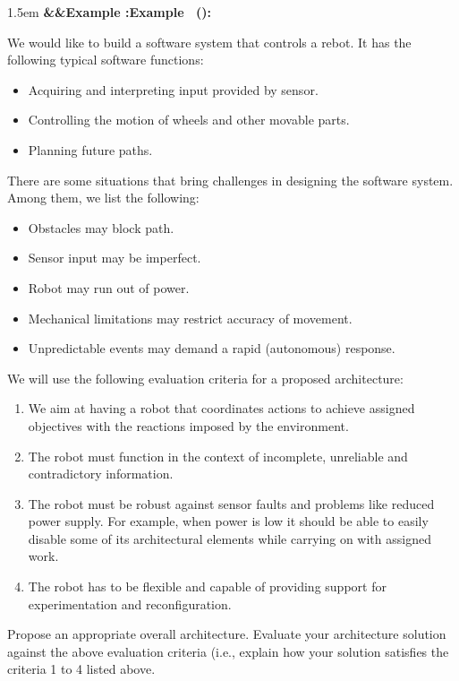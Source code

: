 \documentclass{article}
\newcounter{example}
\renewcommand{\theexample}{\arabic{example}}
\newenvironment{example}[1][]{
	\refstepcounter{example}
	\begin{adjustwidth}{1.5em}{}
	\noindent\textbf{\ifx&#1&Example \theexample:\else Example \theexample \ (#1):\fi}
	\ignorespaces
}{
	\vspace{.5em}
	\end{adjustwidth}
}
\begin{document}
\begin{example}
	We would like to build a software system that controls a rebot. It has the following typical
	software functions:

	\begin{itemize}
		\item Acquiring and interpreting input provided by sensor.
		\item Controlling the motion of wheels and other movable parts.
		\item Planning future paths.
	\end{itemize}
	There are some situations that bring challenges in designing the software system. Among them, we list
	the following:
	\begin{itemize}
		\item Obstacles may block path.
		\item Sensor input may be imperfect.
		\item Robot may run out of power.
		\item Mechanical limitations may restrict accuracy of movement.
		\item Unpredictable events may demand a rapid (autonomous) response.
	\end{itemize}

	We will use the following evaluation criteria for a proposed architecture:
	\begin{enumerate}
		\item We aim at having a robot that coordinates actions to achieve assigned objectives with the reactions imposed by the environment.
		\item The robot must function in the context of incomplete, unreliable and contradictory information.
		\item The robot must be robust against sensor faults and problems like reduced power supply. For example, when power is low it should be able to easily disable some of its architectural elements while carrying on with assigned work.
		\item The robot has to be flexible and capable of providing support for experimentation and reconfiguration.
	\end{enumerate}

	Propose an appropriate overall architecture. Evaluate your architecture solution against the above evaluation criteria (i.e., explain how your solution satisfies the criteria 1 to 4 listed above.
\end{example}
\end{document}
